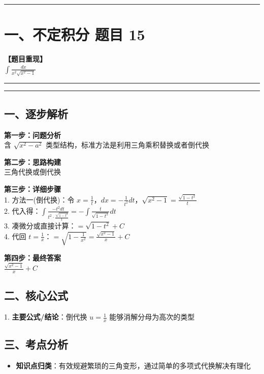 ﻿\documentclass[12pt, a4paper]{ctexart}
\newcommand{\TopSeparator}{
    \par\noindent\rule{\textwidth}{1.5pt}\vspace{0.5em}
}
\newcommand{\AnalysisSeparator}{
    \par\noindent\rule{\textwidth}{0.5pt}\vspace{0.2em}\hrule\vspace{0.5em}
}
\newenvironment{RedAnalysis}{
    \par
    \color{red} 
}{
    \par
    \color{black} 
}
\begin{document}
\vspace{2em}

\TopSeparator
\section*{一、不定积分 题目 15}

\textbf{【题目重现】} \\
$\int \frac{dx}{x^2\sqrt{x^2-1}}$

\AnalysisSeparator

\begin{RedAnalysis}

	\subsection*{一、逐步解析}

	\textbf{第一步：问题分析} \\
	含 $\sqrt{x^2-a^2}$ 类型结构，标准方法是利用三角乘积替换或者倒代换

	\textbf{第二步：思路构建} \\
	三角代换或倒代换

	\textbf{第三步：详细步骤} \\
	1. 方法一(倒代换)：令 $x = \frac{1}{t}$，$dx = -\frac{1}{t^2} dt$，$\sqrt{x^2-1} = \frac{\sqrt{1-t^2}}{t}$ \\ 
	2. 代入得：$\int \frac{-t^2 dt}{t^2 \cdot \frac{\sqrt{1-t^2}}{t}} = -\int \frac{t}{\sqrt{1-t^2}} dt$ \\ 
	3. 凑微分或直接计算：$= \sqrt{1-t^2} + C$ \\ 
	4. 代回 $t=\frac{1}{x}$：$ = \sqrt{1-\frac{1}{x^2}} = \frac{\sqrt{x^2-1}}{x} + C$

	\textbf{第四步：最终答案} \\
	$\frac{\sqrt{x^2-1}}{x} + C$

	\subsection*{二、核心公式}
	1. \textbf{主要公式/结论}：$\text{倒代换 } u = \frac{1}{x} \text{ 能够消解分母为高次的类型}$

	\subsection*{三、考点分析}
	\begin{itemize}
		\item \textbf{知识点归类}：有效规避繁琐的三角变形，通过简单的多项式代换解决有理化
	\end{itemize}

\end{RedAnalysis}
\end{document}
